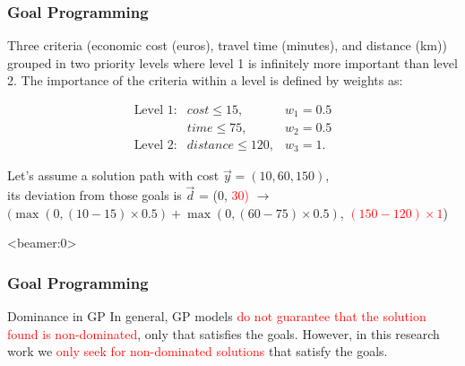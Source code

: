 \begin{frame}
\frametitle{Goal Programming}
	\begin{example}
		Three criteria (economic cost (euros), travel time (minutes), and distance (km)) grouped in \textcolor{ao}{two priority levels} where level 1 is \textcolor{ao}{infinitely more important} than level 2. The importance of the criteria within a level is defined by \textcolor{ao}{weights} as: 
	\end{example}
	\begin{equation*}
     \begin{array}{cll}
     	\textrm{Level 1:} & cost \leq 15,      & w_1 = 0.5 \\
     					  & time \leq 75 ,     & w_2 = 0.5 \\ 
       	\textrm{Level 2:} & distance \leq 120, & w_3 = 1.
     \end{array}
   \end{equation*}
   \begin{example}
		Let's assume a \textcolor{ao}{solution path} with cost $\vec y = (10, 60, 150)$, \\
		its \textcolor{ao}{deviation} from those goals is $\vec d$ = (0, \textcolor<2>{red}{30)} $\rightarrow$ \\
		$(\max(0, (10 - 15) \times 0.5) + \max(0, (60 - 75) \times 0.5)$, \textcolor<2>{red}{$(150 - 120) \times 1$})
	\end{example}
\end{frame}
\begin{frame}<beamer:0>
\frametitle{Goal Programming}
	\begin{alertblock}{Dominance in GP}
		\vspace{1mm}
		In general, GP models \textcolor{red}{do not guarantee that the solution found is non-dominated}, only that satisfies the goals. However, in this research work we \textcolor{red}{only seek for non-dominated solutions} that satisfy the goals.
		\vspace{1mm}
	\end{alertblock}
\note{}
\end{frame}
